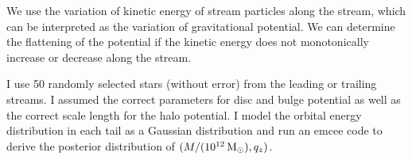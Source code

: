 We use the variation of kinetic energy of stream particles along the stream, which can be interpreted as the variation of gravitational potential. We can determine the flattening of the potential if the kinetic energy does not monotonically increase or decrease along the stream.

I use 50 randomly selected stars (without error) from the leading or trailing streams. I assumed the correct parameters for disc and bulge potential as well as the correct scale length for the halo potential. I model the orbital energy distribution in each tail as a Gaussian distribution and run an emcee code to derive the posterior distribution of $(M/(10^{12}\mbox{$\,{\rm M}_\odot$}), q_z)$.